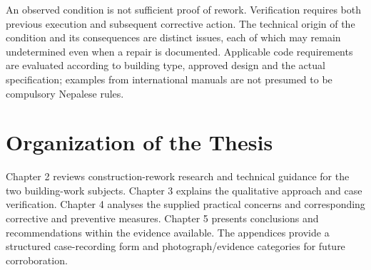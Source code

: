 An observed condition is not sufficient proof of rework. Verification requires both previous execution and subsequent corrective action. The technical origin of the condition and its consequences are distinct issues, each of which may remain undetermined even when a repair is documented. Applicable code requirements are evaluated according to building type, approved design and the actual specification; examples from international manuals are not presumed to be compulsory Nepalese rules.

\section{Organization of the Thesis}
Chapter 2 reviews construction-rework research and technical guidance for the two building-work subjects. Chapter 3 explains the qualitative approach and case verification. Chapter 4 analyses the supplied practical concerns and corresponding corrective and preventive measures. Chapter 5 presents conclusions and recommendations within the evidence available. The appendices provide a structured case-recording form and photograph/evidence categories for future corroboration.
